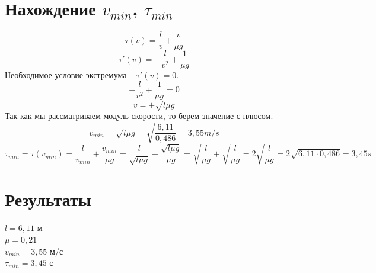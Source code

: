 \documentclass[12pt]{article}
\begin{document}
	\section{Нахождение $v_{min}$, $\tau_{min}$}
	$$\tau(v) = \frac{l}{v} + \frac{v}{\mu g}$$
	$$\tau'(v) = -\frac{l}{v^2} + \frac{1}{\mu g}$$
	Необходимое условие экстремума -- $\tau'(v) = 0$.
	$$-\frac{l}{v^2} + \frac{1}{\mu g} = 0$$
	$$v = \pm\sqrt{l\mu g}$$
	Так как мы рассматриваем модуль скорости, то берем значение с плюсом.
	$$v_{min} = \sqrt{l\mu g} = \sqrt{\frac{6{,}11}{0{,}486}} = 3{,}55 m/s$$
	$$\tau_{min} = \tau(v_{min}) = \frac{l}{v_{min}} + \frac{v_{min}}{\mu g} = \frac{l}{\sqrt{l\mu g}} + \frac{\sqrt{l\mu g}}{\mu g} = \sqrt{\frac{l}{\mu g}}+\sqrt{\frac{l}{\mu g}} = 2\sqrt{\frac{l}{\mu g}}=2\sqrt{6{,}11\cdot0{,}486} = 3{,}45 s$$
	\section{Результаты}
	$l = 6{,}11$ м\\
	$\mu = 0{,}21$\\
	$v_{min} = 3{,}55$ м/с\\
	$\tau_{min} = 3{,}45$ с
	
\end{document}
